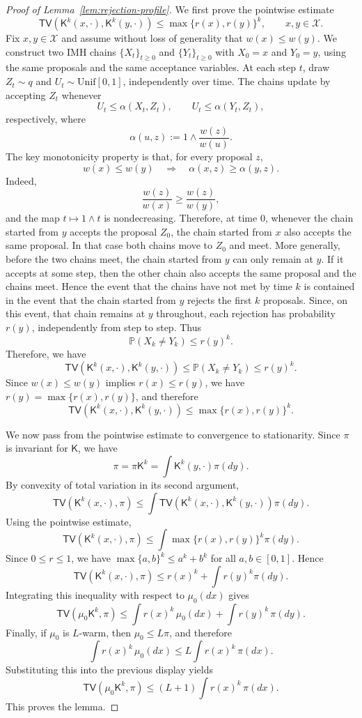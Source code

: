 \documentclass[10pt, journal]{IEEEtran}
\newcommand{\sK}{\mathsf{K}}
\begin{document}
\begin{proof}[Proof of Lemma~\ref{lem:rejection-profile}]
    We first prove the pointwise estimate $$\mathsf{TV}(\sK^k(x,\cdot),\sK^k(y,\cdot))\le \max\{r(x),r(y)\}^k,\qquad x,y\in\mathcal X.$$ Fix $x,y\in\mathcal X$ and assume without loss of generality that $w(x)\le w(y)$. We construct two IMH chains $\{X_t\}_{t\ge0}$ and $\{Y_t\}_{t\ge0}$ with $X_0=x$ and $Y_0=y$, using the same proposals and the same acceptance variables. At each step $t$, draw $Z_t\sim q$ and $U_t\sim\mathrm{Unif}[0,1]$, independently over time. The chains update by accepting $Z_t$ whenever $$U_t\le \alpha(X_t,Z_t),\qquad U_t\le \alpha(Y_t,Z_t),$$ respectively, where $$\alpha(u,z):=1\wedge\frac{w(z)}{w(u)}.$$
The key monotonicity property is that, for every proposal $z$, $$w(x)\le w(y)\quad\Longrightarrow\quad \alpha(x,z)\ge \alpha(y,z).$$ Indeed, $$\frac{w(z)}{w(x)}\ge \frac{w(z)}{w(y)},$$ and the map $t\mapsto 1\wedge t$ is nondecreasing. Therefore, at time $0$, whenever the chain started from $y$ accepts the proposal $Z_0$, the chain started from $x$ also accepts the same proposal. In that case both chains move to $Z_0$ and meet. 
More generally, before the two chains meet, the chain started from $y$ can only remain at $y$. If it accepts at some step, then the other chain also accepts the same proposal and the chains meet. Hence the event that the chains have not met by time $k$ is contained in the event that the chain started from $y$ rejects the first $k$ proposals. Since, on this event, that chain remains at $y$ throughout, each rejection has probability $r(y)$, independently from step to step. Thus $$\mathbb P(X_k\ne Y_k)\le r(y)^k.$$ 
Therefore, we have  $$\mathsf{TV}(\sK^k(x,\cdot),\sK^k(y,\cdot))\le \mathbb P(X_k\ne Y_k)\le r(y)^k.$$ Since $w(x)\le w(y)$ implies $r(x)\le r(y)$, we have $r(y)=\max\{r(x),r(y)\}$, and therefore $$\mathsf{TV}(\sK^k(x,\cdot),\sK^k(y,\cdot))\le \max\{r(x),r(y)\}^k.$$

We now pass from the pointwise estimate to convergence to stationarity. Since $\pi$ is invariant for $\sK$, we have $$\pi=\pi\sK^k=\int \sK^k(y,\cdot)\pi(dy).$$ By convexity of total variation in its second argument, $$\mathsf{TV}(\sK^k(x,\cdot),\pi)\le \int \mathsf{TV}(\sK^k(x,\cdot),\sK^k(y,\cdot))\pi(dy).$$ Using the pointwise estimate, $$\mathsf{TV}(\sK^k(x,\cdot),\pi)\le \int \max\{r(x),r(y)\}^k\pi(dy).$$ Since $0\le r\le1$, we have $\max\{a,b\}^k\le a^k+b^k$ for all $a,b\in[0,1]$. Hence $$\mathsf{TV}(\sK^k(x,\cdot),\pi)\le r(x)^k+\int r(y)^k\pi(dy).$$ Integrating this inequality with respect to $\mu_0(dx)$ gives $$\mathsf{TV}(\mu_0\sK^k,\pi)\le \int r(x)^k\,\mu_0(dx)+\int r(y)^k\,\pi(dy).$$ Finally, if $\mu_0$ is $L$-warm, then $\mu_0\le L\pi$, and therefore $$\int r(x)^k\,\mu_0(dx)\le L\int r(x)^k\,\pi(dx).$$ Substituting this into the previous display yields $$\mathsf{TV}(\mu_0\sK^k,\pi)\le (L+1)\int r(x)^k\,\pi(dx).$$ This proves the lemma. 
\end{proof}
\end{document}
